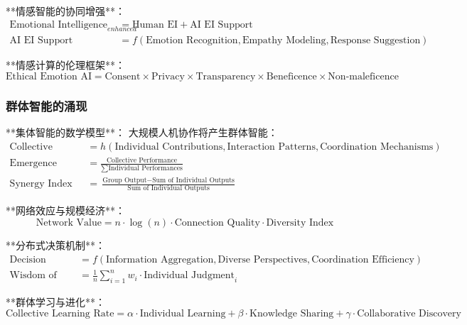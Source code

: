 **情感智能的协同增强**：
\begin{align}
\text{Emotional Intelligence}_{enhanced} &= \text{Human EI} + \text{AI EI Support} \\
\text{AI EI Support} &= f(\text{Emotion Recognition}, \text{Empathy Modeling}, \text{Response Suggestion})
\end{align}

**情感计算的伦理框架**：
\begin{equation}
\text{Ethical Emotion AI} = \text{Consent} \times \text{Privacy} \times \text{Transparency} \times \text{Beneficence} \times \text{Non-maleficence}
\end{equation}

\subsubsection{群体智能的涌现} %

**集体智能的数学模型**：
大规模人机协作将产生群体智能：
\begin{align}
\text{Collective Intelligence} &= h(\text{Individual Contributions}, \text{Interaction Patterns}, \text{Coordination Mechanisms}) \\
\text{Emergence Factor} &= \frac{\text{Collective Performance}}{\sum \text{Individual Performances}} \\
\text{Synergy Index} &= \frac{\text{Group Output} - \text{Sum of Individual Outputs}}{\text{Sum of Individual Outputs}}
\end{align}

**网络效应与规模经济**：
\begin{equation}
\text{Network Value} = n \cdot \log(n) \cdot \text{Connection Quality} \cdot \text{Diversity Index}
\end{equation}

**分布式决策机制**：
\begin{align}
\text{Decision Quality} &= f(\text{Information Aggregation}, \text{Diverse Perspectives}, \text{Coordination Efficiency}) \\
\text{Wisdom of Crowds} &= \frac{1}{n} \sum_{i=1}^{n} w_i \cdot \text{Individual Judgment}_i
\end{align}

**群体学习与进化**：
\begin{equation}
\text{Collective Learning Rate} = \alpha \cdot \text{Individual Learning} + \beta \cdot \text{Knowledge Sharing} + \gamma \cdot \text{Collaborative Discovery}
\end{equation}

